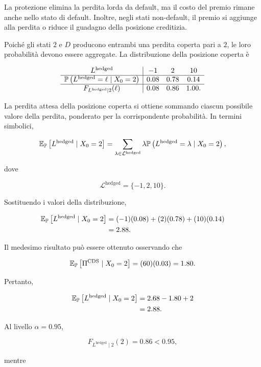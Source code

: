 La protezione elimina la perdita lorda da default, ma il costo del
premio rimane anche nello stato di default. Inoltre, negli stati
non-default, il premio si aggiunge alla perdita o riduce il guadagno
della posizione creditizia.

Poich\'{e} gli stati $2$ e $D$ producono entrambi una perdita coperta
pari a $2$, le loro probabilit\`{a} devono essere aggregate. La
distribuzione della posizione coperta \`{e}

\[
\begin{array}{c|ccc}
L^{\mathrm{hedged}}
&
-1
&
2
&
10
\\
\hline
\mathbb{P}
\left(
L^{\mathrm{hedged}}=\ell
\mid X_0=2
\right)
&
0.08
&
0.78
&
0.14
\\
\hline
F_{L^{\mathrm{hedged}}\mid 2}(\ell)
&
0.08
&
0.86
&
1.00.
\end{array}
\]

La perdita attesa della posizione coperta si ottiene sommando ciascun
possibile valore della perdita, ponderato per la corrispondente
probabilit\`{a}. In termini simbolici,

\[
\mathbb{E}_{\mathbb{P}}
\left[
L^{\mathrm{hedged}}
\mid X_0=2
\right]
=
\sum_{\lambda\in\mathcal{L}^{\mathrm{hedged}}}
\lambda
\mathbb{P}
\left(
L^{\mathrm{hedged}}=\lambda
\mid X_0=2
\right),
\]

dove

\[
\mathcal{L}^{\mathrm{hedged}}
=
\{-1,2,10\}.
\]

Sostituendo i valori della distribuzione,

\[
\begin{split}
\mathbb{E}_{\mathbb{P}}
\left[
L^{\mathrm{hedged}}
\mid X_0=2
\right]
&=
(-1)(0.08)
+
(2)(0.78)
+
(10)(0.14)
\\
&=
2.88.
\end{split}
\]

Il medesimo risultato pu\`{o} essere ottenuto osservando che

\[
\mathbb{E}_{\mathbb{P}}
\left[
\Pi^{\mathrm{CDS}}
\mid X_0=2
\right]
=
(60)(0.03)
=
1.80.
\]

Pertanto,

\[
\begin{split}
\mathbb{E}_{\mathbb{P}}
\left[
L^{\mathrm{hedged}}
\mid X_0=2
\right]
&=
2.68-1.80+2
\\
&=
2.88.
\end{split}
\]

Al livello $\alpha=0.95$,

\[
F_{L^{\mathrm{hedged}}\mid 2}(2)
=
0.86
<
0.95,
\]

mentre

